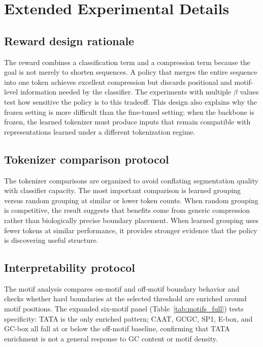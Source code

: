 \documentclass[sigconf,screen]{acmart}
\begin{document}



\appendix

\section{Extended Experimental Details}

\subsection{Reward design rationale}
The reward combines a classification term and a compression term because the goal is not merely to shorten sequences. A policy that merges the entire sequence into one token achieves excellent compression but discards positional and motif-level information needed by the classifier. The experiments with multiple $\beta$ values test how sensitive the policy is to this tradeoff. This design also explains why the frozen setting is more difficult than the fine-tuned setting: when the backbone is frozen, the learned tokenizer must produce inputs that remain compatible with representations learned under a different tokenization regime.

\subsection{Tokenizer comparison protocol}
The tokenizer comparisons are organized to avoid conflating segmentation quality with classifier capacity. The most important comparison is learned grouping versus random grouping at similar or lower token counts. When random grouping is competitive, the result suggests that benefits come from generic compression rather than biologically precise boundary placement. When learned grouping uses fewer tokens at similar performance, it provides stronger evidence that the policy is discovering useful structure.

\subsection{Interpretability protocol}
The motif analysis compares on-motif and off-motif boundary behavior and checks whether hard boundaries at the selected threshold are enriched around motif positions. The expanded six-motif panel (Table~\ref{tab:motifs_full}) tests specificity: TATA is the only enriched pattern; CAAT, GCGC, SP1, E-box, and GC-box all fall at or below the off-motif baseline, confirming that TATA enrichment is not a general response to GC content or motif density.
\end{document}
